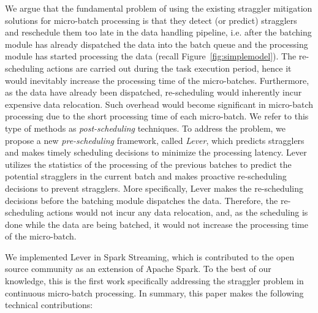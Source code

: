 We argue that the fundamental problem of using the existing straggler mitigation
solutions for micro-batch processing is that they detect (or predict)
stragglers and reschedule them too late in the data handling pipeline, i.e.
after the batching module has already dispatched the data into the batch queue
and the processing module has started processing the data
(recall Figure~\ref{fig:simplemodel}). The re-scheduling actions are carried out during
the task execution period, hence it would inevitably increase the processing
time of the micro-batches. Furthermore, as the data have already been
dispatched, re-scheduling would inherently incur expensive data relocation. Such
overhead would become significant in micro-batch processing due to the short
processing time of each micro-batch. We refer to this type of methods as
\emph{post-scheduling} techniques. To address the problem, we propose a new
\emph{pre-scheduling} framework, called \emph{Lever}, which predicts stragglers
and makes timely scheduling decisions to minimize the processing latency. Lever
utilizes the statistics of the processing of the previous batches to predict the
potential stragglers in the current batch and makes proactive re-scheduling
decisions to prevent stragglers. More specifically, Lever makes the
re-scheduling decisions before the batching module dispatches the data.
Therefore, the re-scheduling actions would not incur any data relocation, and, as
the scheduling is done while the data are being batched, it would not increase
the processing time of the micro-batch. 

We implemented Lever in Spark Streaming, which is contributed to the open source
community as an extension of Apache Spark. To the best of our knowledge, this is
the first work specifically addressing the straggler problem in continuous
micro-batch processing. In summary, this paper makes the following technical
contributions:

